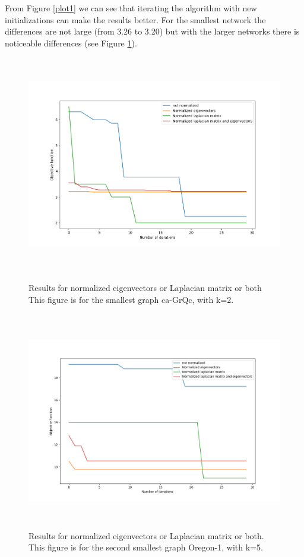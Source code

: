 \documentclass{article}
\begin{document}
From Figure \ref{plot1} we can see that iterating the algorithm with
new initializations can make the results better. For the smallest
network the differences are not large (from 3.26 to 3.20) but with the
larger networks there is noticeable differences (see Figure \ref{normalized2}).
\clearpage

\begin{figure}[htb]
\begin{center} 
\includegraphics[height=9.5cm]{normalization_plot.png}
\end{center}
\caption{Results for normalized eigenvectors or Laplacian matrix or both
This figure is for the smallest graph ca-GrQc, with k=2.}
\label{normalized}
\begin{center} 
	\includegraphics[height=9.5cm]{normalization_plot-oregonk5.png}
	\end{center}
	\caption{Results for normalized eigenvectors or Laplacian matrix or both.
	This figure is for the second smallest graph Oregon-1, with k=5.}
	\label{normalized2}
\end{figure}
\end{document}
